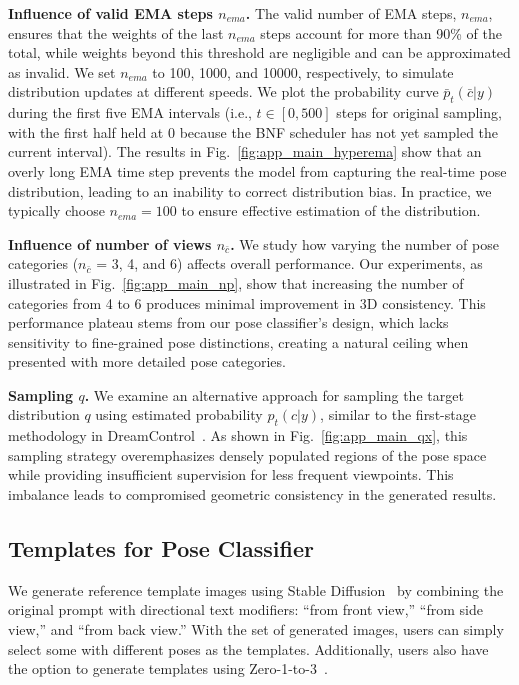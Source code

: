 \textbf{Influence of valid EMA steps $n_{ema}$.} The valid number of EMA steps, $n_{ema}$, ensures that the weights of the last $n_{ema}$ steps account for more than 90\% of the total, while weights beyond this threshold are negligible and can be approximated as invalid. We set $n_{ema}$ to 100, 1000, and 10000, respectively, to simulate distribution updates at different speeds. We plot the probability curve $\bar{p}_t(\bar{c}|y)$ during the first five EMA intervals (i.e., $t \in [0, 500]$ steps for original sampling, with the first half held at 0 because the BNF scheduler has not yet sampled the current interval). The results in Fig.~\ref{fig:app_main_hyperema} show that an overly long EMA time step prevents the model from capturing the real-time pose distribution, leading to an inability to correct distribution bias. In practice, we typically choose $n_{ema}=100$ to ensure effective estimation of the distribution.










\textbf{Influence of number of views $n_{\bar{c}}$.} We study how varying the number of pose categories ($n_{\bar{c}}$ = 3, 4, and 6) affects overall performance. Our experiments, as illustrated in Fig.~\ref{fig:app_main_np}, show that increasing the number of categories from 4 to 6 produces minimal improvement in 3D consistency. This performance plateau stems from our pose classifier's design, which lacks sensitivity to fine-grained pose distinctions, creating a natural ceiling when presented with more detailed pose categories.



\textbf{Sampling $q$.} We examine an alternative approach for sampling the target distribution $q$ using estimated probability $p_t(c|y)$, similar to the first-stage methodology in DreamControl~\citep{huang2024dreamcontrol}. As shown in Fig.~\ref{fig:app_main_qx}, this sampling strategy overemphasizes densely populated regions of the pose space while providing insufficient supervision for less frequent viewpoints. This imbalance leads to compromised geometric consistency in the generated results.







\subsection{Templates for Pose Classifier}\label{app:main_exps_templates}
We generate reference template images using Stable Diffusion~\citep{rombach2022high} by combining the original prompt with directional text modifiers: ``from front view,'' ``from side view,'' and ``from back view.'' With the set of generated images, users can simply select some with different poses as the templates. Additionally, users also have the option to generate templates using Zero-1-to-3~\citep{liu2023zero}.

